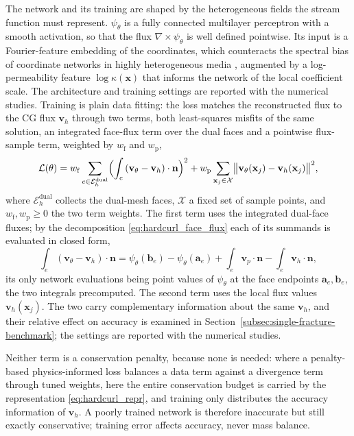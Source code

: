 \documentclass[a4paper,fleqn]{cas-sc}
\newcommand{\vflux}{\mathbf{v}}
\newcommand{\curl}{\nabla\times}          %
\newcommand{\vp}{\vflux_{p}}              %
\begin{document}
The network and its training are shaped by the heterogeneous fields the stream
function must represent. \(\psi_\theta\) is a fully connected multilayer
perceptron with a smooth activation, so that the flux \(\curl\psi_\theta\) is
well defined pointwise. Its input is a Fourier-feature embedding of the
coordinates, which counteracts the spectral bias of coordinate networks in
highly heterogeneous media \citep{Tancik2020,WangWang2021}, augmented by a
log-permeability feature \(\log\kappa(\mathbf{x})\) that informs the network
of the local coefficient scale. The architecture and training settings are
reported with the numerical studies. Training is plain data fitting: the loss matches the reconstructed flux to the CG
flux \(\vflux_h\) through two terms, both least-squares misfits of the same
solution, an integrated face-flux term over the dual faces and a pointwise
flux-sample term, weighted by \(w_{\mathrm f}\) and \(w_{\mathrm p}\),
\begin{equation}
  \mathcal{L}(\theta)
  =
  w_{\mathrm f}\sum_{e\in\mathcal{E}_h^{\mathrm{dual}}}
  \Bigl(\int_e\left(\vflux_\theta-\vflux_h\right)\cdot\mathbf{n}\Bigr)^2
  +
  w_{\mathrm p}\sum_{\mathbf{x}_j\in\mathcal{X}}
  \bigl\|\vflux_\theta(\mathbf{x}_j)-\vflux_h(\mathbf{x}_j)\bigr\|^2 ,
  \label{eq:hardcurl_loss}
\end{equation}
where \(\mathcal{E}_h^{\mathrm{dual}}\) collects the dual-mesh faces,
\(\mathcal{X}\) a fixed set of sample points, and
\(w_{\mathrm f},w_{\mathrm p}\ge0\) the two term weights. The first term uses the integrated
dual-face fluxes; by the decomposition \eqref{eq:hardcurl_face_flux} each of its
summands is evaluated in closed form,
\[
  \int_e\left(\vflux_\theta-\vflux_h\right)\cdot\mathbf{n}
  =
  \psi_\theta(\mathbf{b}_e)-\psi_\theta(\mathbf{a}_e)
  +\int_e\vp\cdot\mathbf{n}
  -\int_e\vflux_h\cdot\mathbf{n} ,
\]
its only network evaluations being point values of \(\psi_\theta\) at the face
endpoints \(\mathbf{a}_e,\mathbf{b}_e\), the two integrals precomputed. The second
term uses the local flux values \(\vflux_h(\mathbf{x}_j)\). The two carry
complementary information about the same \(\vflux_h\), and their relative effect on
accuracy is examined in Section~\ref{subsec:single-fracture-benchmark}; the
settings are reported with the numerical studies.

Neither term is a conservation penalty, because none is needed: where a
penalty-based physics-informed loss balances a data term against a
divergence term through tuned weights, here the entire conservation budget is
carried by the representation \eqref{eq:hardcurl_repr}, and training only
distributes the accuracy information of \(\vflux_h\). A poorly trained network
is therefore inaccurate but still exactly conservative; training error affects
accuracy, never mass balance.
\end{document}
